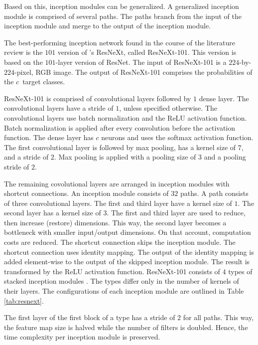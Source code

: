 Based on this, inception modules can be generalized. A generalized inception module is comprised of several paths. The paths branch from the input of the inception module and merge to the output of the inception module. \autocites{Szegedy.2016}{Szegedy.2017}{Xie.2017}
\par
The best-performing inception network found in the course of the literature review is the $101$ version of \cite{Xie.2017}'s ResNeXt, called ResNeXt-101. This version is based on the $101$-layer version of ResNet.
The input of ResNeXt-101 is a $224$-by-$224$-pixel, \ac{RGB} image. The output of ResNeXt-101 comprises the probabilities of the $c$~target classes. \autocite{Xie.2017}
\par
ResNeXt-101 is comprised of convolutional layers followed by $1$ dense layer.
The convolutional layers have a stride of $1$, unless specified otherwise.
The convolutional layers use batch normalization and the \ac{ReLU} activation function.
Batch normalization is applied after every convolution before the activation function.
The dense layer has $c$ neurons and uses the softmax activation function.
The first convolutional layer is followed by max pooling, has a kernel size of $7$, and a stride of $2$.
Max pooling is applied with a pooling size of $3$ and a pooling stride of $2$. \autocite{Xie.2017}
\par
The remaining covolutional layers are arranged in inception modules with shortcut connections. An inception module consists of $32$ paths. A path consists of three convolutional layers. The first and third layer have a kernel size of $1$. The second layer has a kernel size of $3$. The first and third layer are used to reduce, then increase (restore) dimensions. This way, the second layer becomes a bottleneck with smaller input/output dimensions. On that account, computation costs are reduced.
The shortcut connection skips the inception module. The shortcut connection uses identity mapping. The output of the identity mapping is added element-wise to the output of the skipped inception module. The result is transformed by the \ac{ReLU} activation function. \autocite{Xie.2017}
ResNeXt-101 consists of 4 types of stacked inception modules . The types differ only in the number of kernels of their layers. The configurations of each inception module are outlined in Table \ref{tab:resnext}. \autocite{Xie.2017} 
\par
The first layer of the first block of a type has a stride of $2$ for all paths. This way, the feature map size is halved while the number of filters is doubled. Hence, the time complexity per inception module is preserved.
